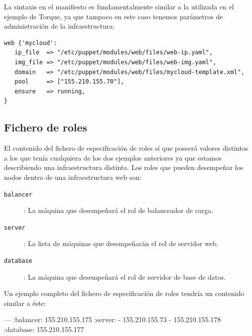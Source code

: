 La sintaxis en el manifiesto es fundamentalmente similar a la utilizada en el ejemplo de Torque, ya que tampoco en este caso tenemos parámetros de administración de la infraestructura:

\begin{lstlisting}
web {'mycloud':
   ip_file  => "/etc/puppet/modules/web/files/web-ip.yaml",
   img_file => "/etc/puppet/modules/web/files/web-img.yaml",
   domain   => "/etc/puppet/modules/web/files/mycloud-template.xml",
   pool     => ["155.210.155.70"],
   ensure   => running,
}
\end{lstlisting}

\subsection{Fichero de roles}

El contenido del fichero de especificación de roles sí que poseerá valores distintos a los que tenía cualquiera de los dos ejemplos anteriores ya que estamos describiendo una infraestructura distinta. Los roles que pueden desempeñar los nodos dentro de una infraestructura web son:
\begin{description}
\item[\texttt{balancer}]: La máquina que desempeñará el rol de balanceador de carga.
\item[\texttt{server}]: La lista de máquinas que desempeñarán el rol de servidor web.
\item[\texttt{database}]: La máquina que desempeñará el rol de servidor de base de datos.
\end{description}

Un ejemplo completo del fichero de especificación de roles tendría un contenido similar a éste:
\begin{yamlcode}
--- 
:balancer: 155.210.155.175
:server:
- 155.210.155.73
- 155.210.155.178
:database: 155.210.155.177
\end{yamlcode}
